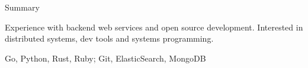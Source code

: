 \documentclass{resume} %
\begin{document}

\begin{rSection}{Summary}
  \begin{rSummarySection}
  {
    \item Experience with backend web services and open source development. Interested in distributed systems, dev tools and systems programming.
    \item Go, Python, Rust, Ruby; Git, ElasticSearch, MongoDB
  }
  \end{rSummarySection}
\end{rSection}

\end{document}
